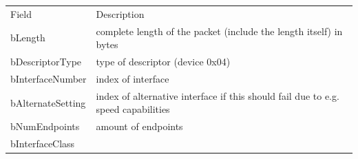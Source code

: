 \begin{longtable}[]{@{}ll@{}}
\toprule
\begin{minipage}[t]{0.47\columnwidth}\raggedright\strut
{Field}
\strut\end{minipage} &
\begin{minipage}[t]{0.47\columnwidth}\raggedright\strut
{Description}
\strut\end{minipage}\tabularnewline
\begin{minipage}[t]{0.47\columnwidth}\raggedright\strut
{bLength}
\strut\end{minipage} &
\begin{minipage}[t]{0.47\columnwidth}\raggedright\strut
{complete length of the packet (include the length itself) in bytes}
\strut\end{minipage}\tabularnewline
\begin{minipage}[t]{0.47\columnwidth}\raggedright\strut
{bDescriptorType}
\strut\end{minipage} &
\begin{minipage}[t]{0.47\columnwidth}\raggedright\strut
{type of descriptor (device 0x04)}
\strut\end{minipage}\tabularnewline
\begin{minipage}[t]{0.47\columnwidth}\raggedright\strut
{bInterfaceNumber}
\strut\end{minipage} &
\begin{minipage}[t]{0.47\columnwidth}\raggedright\strut
{index of interface}
\strut\end{minipage}\tabularnewline
\begin{minipage}[t]{0.47\columnwidth}\raggedright\strut
{bAlternateSetting}
\strut\end{minipage} &
\begin{minipage}[t]{0.47\columnwidth}\raggedright\strut
{index of alternative interface if this should fail due to e.g. speed
capabilities}
\strut\end{minipage}\tabularnewline
\begin{minipage}[t]{0.47\columnwidth}\raggedright\strut
{bNumEndpoints}
\strut\end{minipage} &
\begin{minipage}[t]{0.47\columnwidth}\raggedright\strut
{amount of endpoints}
\strut\end{minipage}\tabularnewline
\begin{minipage}[t]{0.47\columnwidth}\raggedright\strut
{bInterfaceClass}
\strut\end{minipage} &
\begin{minipage}[t]{0.47\columnwidth}\raggedright\strut

\end{minipage}
\end{longtable}
